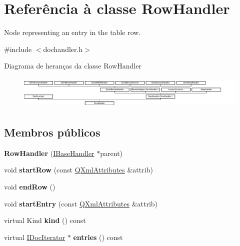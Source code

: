 \hypertarget{class_row_handler}{\section{Referência à classe Row\-Handler}
\label{class_row_handler}
}


Node representing an entry in the table row.  




{\ttfamily \#include $<$dochandler.\-h$>$}

Diagrama de heranças da classe Row\-Handler\begin{figure}[H]
\begin{center}
\leavevmode
\includegraphics[height=1.592040cm]{class_row_handler}
\end{center}
\end{figure}
\subsection*{Membros públicos}
\begin{DoxyCompactItemize}
\item 
\hypertarget{class_row_handler_ad31ea6f6a8627949a856417fa912620d}{{\bfseries Row\-Handler} (\hyperlink{class_i_base_handler}{I\-Base\-Handler} $\ast$parent)}\label{class_row_handler_ad31ea6f6a8627949a856417fa912620d}

\item 
\hypertarget{class_row_handler_a5407854e868c694b4f88e5211f863b0f}{void {\bfseries start\-Row} (const \hyperlink{class_q_xml_attributes}{Q\-Xml\-Attributes} \&attrib)}\label{class_row_handler_a5407854e868c694b4f88e5211f863b0f}

\item 
\hypertarget{class_row_handler_a0cd157d356695b35157f9a8c6f3d1b39}{void {\bfseries end\-Row} ()}\label{class_row_handler_a0cd157d356695b35157f9a8c6f3d1b39}

\item 
\hypertarget{class_row_handler_ac235cd02462379ae5f73c64fa4141c50}{void {\bfseries start\-Entry} (const \hyperlink{class_q_xml_attributes}{Q\-Xml\-Attributes} \&attrib)}\label{class_row_handler_ac235cd02462379ae5f73c64fa4141c50}

\item 
\hypertarget{class_row_handler_af8e62c8a81ddf2283205cc8955de50eb}{virtual Kind {\bfseries kind} () const }\label{class_row_handler_af8e62c8a81ddf2283205cc8955de50eb}

\item 
\hypertarget{class_row_handler_a471f34805bf0eb6472512f5c9b5f0d10}{virtual \hyperlink{class_i_doc_iterator}{I\-Doc\-Iterator} $\ast$ {\bfseries entries} () const }\label{class_row_handler_a471f34805bf0eb6472512f5c9b5f0d10}

\end{DoxyCompactItemize}
